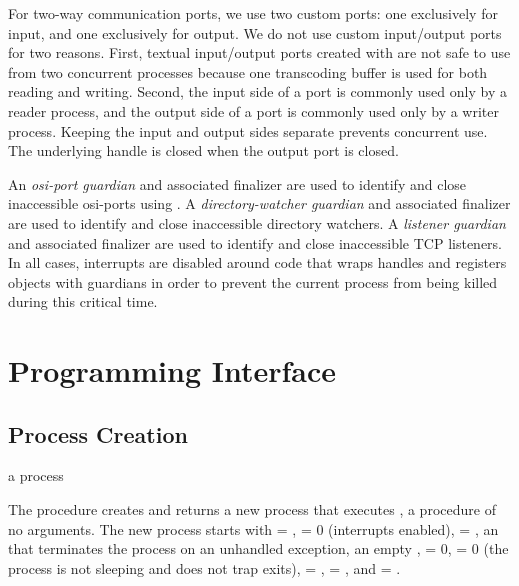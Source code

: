 For two-way communication ports, we use two custom ports: one
exclusively for input, and one exclusively for output. We do not use
custom input/output ports for two reasons.  First, textual
input/output ports created with  are not safe
to use from two concurrent processes because one transcoding buffer is
used for both reading and writing.  Second, the input side of a port
is commonly used only by a reader process, and the output side of a
port is commonly used only by a writer process.  Keeping the input and
output sides separate prevents concurrent use. The underlying handle
is closed when the output port is closed.

  \mitigation An
\emph{osi-port guardian} and associated
finalizer are used to identify and close inaccessible osi-ports using
. A \emph{directory-watcher
  guardian} and associated finalizer
are used to identify and close inaccessible directory
watchers.  A \emph{listener
  guardian} and associated finalizer are used
to identify and close inaccessible TCP listeners. In all cases, interrupts are disabled around code that
wraps handles and registers objects with guardians in order to prevent
the current process from being killed during this critical time.

\section {Programming Interface}\label{sec:erlang-api}

\subsection {Process Creation}

\begin{procedure}
\end{procedure}
\returns{} a process

The  procedure creates and returns a new process that
executes , a procedure of no arguments. The new process
starts with  = ,  = 0 (interrupts
enabled),  = \code{()}, an 
that terminates the process on an unhandled exception, an empty
,  = 0,  = 0 (the
process is not sleeping and does not trap exits),  =
\code{()},  = \code{()}, and  =
.

